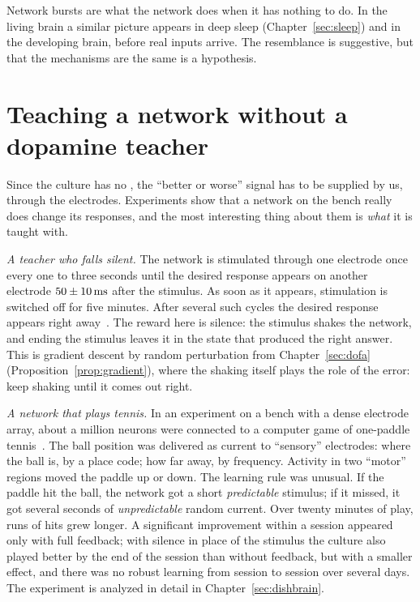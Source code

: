Network bursts are what the network does when it has nothing to do. In the living brain a similar picture appears in deep sleep (Chapter~\ref{sec:sleep}) and in the developing brain, before real inputs arrive. The resemblance is suggestive, but that the mechanisms are the same is a hypothesis.

\section{Teaching a network without a dopamine teacher}

Since the culture has no , the ``better or worse'' signal has to be supplied by us, through the electrodes. Experiments show that a network on the bench really does change its responses, and the most interesting thing about them is \emph{what} it is taught with.

\emph{A teacher who falls silent.} The network is stimulated through one electrode once every one to three seconds until the desired response appears on another electrode $50\pm10\,\text{ms}$ after the stimulus. As soon as it appears, stimulation is switched off for five minutes. After several such cycles the desired response appears right away~\cite{Shahaf2001}. The reward here is silence: the stimulus shakes the network, and ending the stimulus leaves it in the state that produced the right answer. This is gradient descent by random perturbation from Chapter~\ref{sec:dofa} (Proposition~\ref{prop:gradient}), where the shaking itself plays the role of the error: keep shaking until it comes out right.

\emph{A network that plays tennis.} In an experiment on a bench with a dense electrode array, about a million neurons were connected to a computer game of one-paddle tennis~\cite{Kagan2022}. The ball position was delivered as current to ``sensory'' electrodes: where the ball is, by a place code; how far away, by frequency. Activity in two ``motor'' regions moved the paddle up or down. The learning rule was unusual. If the paddle hit the ball, the network got a short \emph{predictable} stimulus; if it missed, it got several seconds of \emph{unpredictable} random current. Over twenty minutes of play, runs of hits grew longer. A significant improvement within a session appeared only with full feedback; with silence in place of the stimulus the culture also played better by the end of the session than without feedback, but with a smaller effect, and there was no robust learning from session to session over several days. The experiment is analyzed in detail in Chapter~\ref{sec:dishbrain}.

